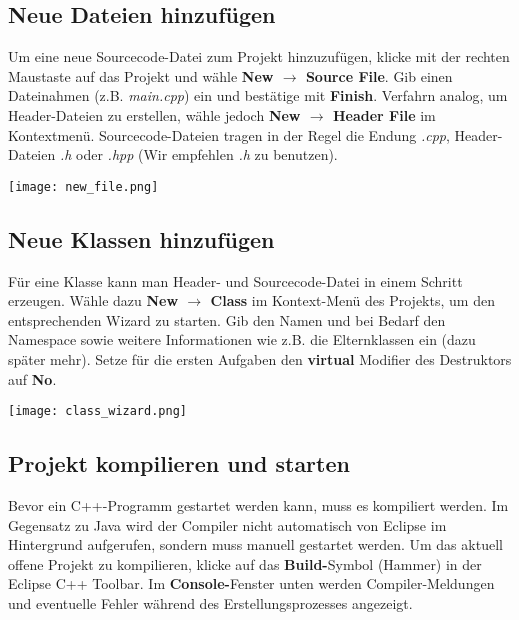 \subsection{Neue Dateien hinzufügen}

Um eine neue Sourcecode-Datei zum Projekt hinzuzufügen, klicke mit der rechten Maustaste auf das Projekt und wähle \textbf{New $\rightarrow$ Source File}.
Gib einen Dateinahmen (z.B. \emph{main.cpp}) ein und bestätige mit 
\textbf{Finish}. 
Verfahrn analog, um Header-Dateien zu erstellen, wähle jedoch \textbf{New $\rightarrow$ Header File} im Kontextmenü.
Sourcecode-Dateien tragen in der Regel die Endung \emph{.cpp}, Header-Dateien \emph{.h} oder \emph{.hpp} (Wir empfehlen \emph{.h} zu benutzen).

\begin{center}
	\texttt{[image: new\_file.png]}
\end{center}

\subsection{Neue Klassen hinzufügen}

Für eine Klasse kann man Header- und Sourcecode-Datei in einem Schritt erzeugen.
Wähle dazu \textbf{New $\rightarrow$ Class} im Kontext-Menü des Projekts, um den entsprechenden Wizard zu starten.
Gib den Namen und bei Bedarf den Namespace sowie weitere Informationen wie z.B. die Elternklassen ein (dazu später mehr).
Setze für die ersten Aufgaben den \textbf{virtual} Modifier des Destruktors auf \textbf{No}.

\begin{center}
	\texttt{[image: class\_wizard.png]}
\end{center}

\subsection{Projekt kompilieren und starten}

Bevor ein C++-Programm gestartet werden kann, muss es kompiliert werden.
Im Gegensatz zu Java wird der Compiler nicht automatisch von Eclipse im Hintergrund aufgerufen, sondern muss manuell gestartet werden.
Um das aktuell offene Projekt zu kompilieren, klicke auf das \textbf{Build-}Symbol (\glqq Hammer\grqq) in der Eclipse C++ Toolbar.
Im \textbf{Console-}Fenster unten werden Compiler-Meldungen und eventuelle Fehler während des Erstellungsprozesses angezeigt.

